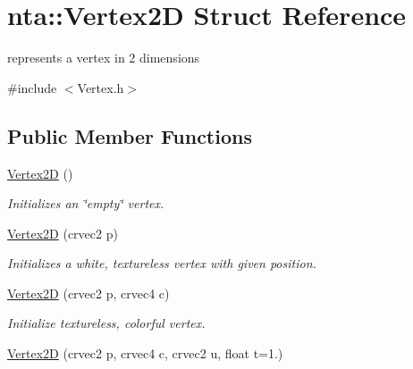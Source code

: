 \hypertarget{structnta_1_1Vertex2D}{}\section{nta\+:\+:Vertex2D Struct Reference}
\label{structnta_1_1Vertex2D}


represents a vertex in 2 dimensions  




{\ttfamily \#include $<$Vertex.\+h$>$}

\subsection*{Public Member Functions}
\begin{DoxyCompactItemize}
\item 
\mbox{\label{structnta_1_1Vertex2D_a696744d55f56ae170684266eab073c0f}} 
\hyperlink{structnta_1_1Vertex2D_a696744d55f56ae170684266eab073c0f}{Vertex2D} ()
\begin{DoxyCompactList}\small\item\em Initializes an \char`\"{}empty\char`\"{} vertex. \end{DoxyCompactList}\item 
\mbox{\label{structnta_1_1Vertex2D_ab0988223c10ad83057c4ade8891b4814}} 
\hyperlink{structnta_1_1Vertex2D_ab0988223c10ad83057c4ade8891b4814}{Vertex2D} (crvec2 p)
\begin{DoxyCompactList}\small\item\em Initializes a white, textureless vertex with given position. \end{DoxyCompactList}\item 
\mbox{\label{structnta_1_1Vertex2D_aa2e8619f157a72c64d2438f49ec65554}} 
\hyperlink{structnta_1_1Vertex2D_aa2e8619f157a72c64d2438f49ec65554}{Vertex2D} (crvec2 p, crvec4 c)
\begin{DoxyCompactList}\small\item\em Initialize textureless, colorful vertex. \end{DoxyCompactList}\item 
\mbox{\label{structnta_1_1Vertex2D_a1c2fe391aeb3ca6d0b8eebfbce1b5862}} 
\hyperlink{structnta_1_1Vertex2D_a1c2fe391aeb3ca6d0b8eebfbce1b5862}{Vertex2D} (crvec2 p, crvec4 c, crvec2 u, float t=1.)

\end{DoxyCompactItemize}
